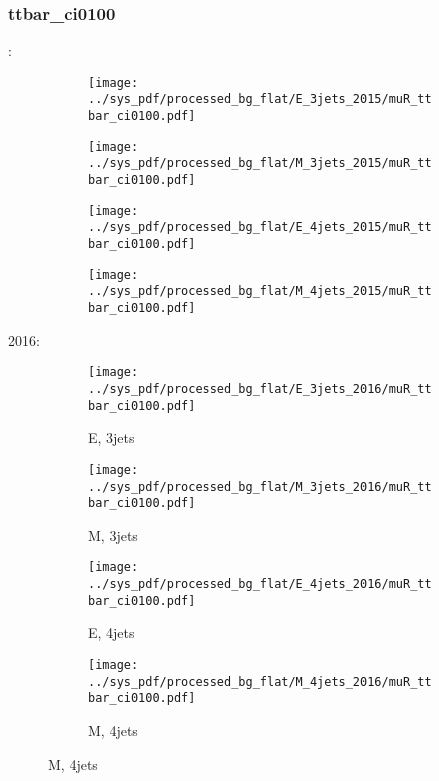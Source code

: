 \documentclass{beamer}
\begin{document}
\begin{frame}
\frametitle{ttbar_ci0100}
\fontsize{5}{1}:
\begin{figure}
\centering
\begin{subfigure}[b]{0.24\textwidth}
\texttt{[image: ../sys\_pdf/processed\_bg\_flat/E\_3jets\_2015/muR\_ttbar\_ci0100.pdf]}
\end{subfigure}
\begin{subfigure}[b]{0.24\textwidth}
\texttt{[image: ../sys\_pdf/processed\_bg\_flat/M\_3jets\_2015/muR\_ttbar\_ci0100.pdf]}
\end{subfigure}
\begin{subfigure}[b]{0.24\textwidth}
\texttt{[image: ../sys\_pdf/processed\_bg\_flat/E\_4jets\_2015/muR\_ttbar\_ci0100.pdf]}
\end{subfigure}
\begin{subfigure}[b]{0.24\textwidth}
\texttt{[image: ../sys\_pdf/processed\_bg\_flat/M\_4jets\_2015/muR\_ttbar\_ci0100.pdf]}
\end{subfigure}
\end{figure}
2016:
\begin{figure}
\centering
\begin{subfigure}[b]{0.24\textwidth}
\texttt{[image: ../sys\_pdf/processed\_bg\_flat/E\_3jets\_2016/muR\_ttbar\_ci0100.pdf]}
\captionsetup{font=tiny}
\caption{E, 3jets}
\end{subfigure}
\begin{subfigure}[b]{0.24\textwidth}
\texttt{[image: ../sys\_pdf/processed\_bg\_flat/M\_3jets\_2016/muR\_ttbar\_ci0100.pdf]}
\captionsetup{font=tiny}
\caption{M, 3jets}
\end{subfigure}
\begin{subfigure}[b]{0.24\textwidth}
\texttt{[image: ../sys\_pdf/processed\_bg\_flat/E\_4jets\_2016/muR\_ttbar\_ci0100.pdf]}
\captionsetup{font=tiny}
\caption{E, 4jets}
\end{subfigure}
\begin{subfigure}[b]{0.24\textwidth}
\texttt{[image: ../sys\_pdf/processed\_bg\_flat/M\_4jets\_2016/muR\_ttbar\_ci0100.pdf]}
\captionsetup{font=tiny}
\caption{M, 4jets}
\end{subfigure}
\end{figure}
\end{frame}
\end{document}
